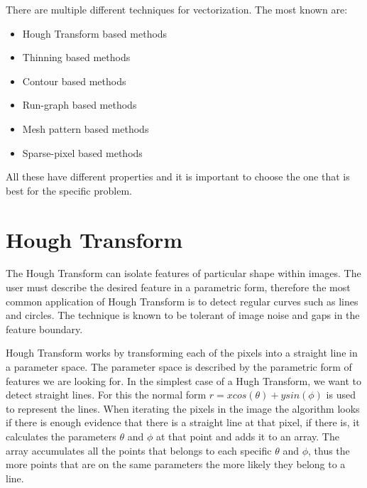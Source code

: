 There are multiple different techniques for vectorization. The most known are:

\begin{itemize}
	\item Hough Transform based methods
	\item Thinning based methods
	\item Contour based methods
	\item Run-graph based methods
	\item Mesh pattern based methods
	\item Sparse-pixel based methods
\end{itemize}

All these have different properties and it is important to choose the one that is best for the specific problem. 

\section{Hough Transform}
The Hough Transform can isolate features of particular shape within images. The user must describe the desired feature in a parametric form, therefore the most common application of Hough Transform is to detect regular curves such as lines and circles. The technique is known to be tolerant of image noise and gaps in the feature boundary.

Hough Transform works by transforming each of the pixels into a straight line in a parameter space. The parameter space is described by the parametric form of features we are looking for. In the simplest case of a Hugh Transform, we want to detect straight lines. For this the normal form $r = x cos(\theta) + y sin(\phi)$ is used to represent the lines. When iterating the pixels in the image the algorithm looks if there is enough evidence that there is a straight line at that pixel, if there is, it calculates the parameters $\theta$ and $\phi$ at that point and adds it to an array. The array accumulates all the points that belongs to each specific $\theta$ and $\phi$, thus the more points that are on the same parameters the more likely they belong to a line.